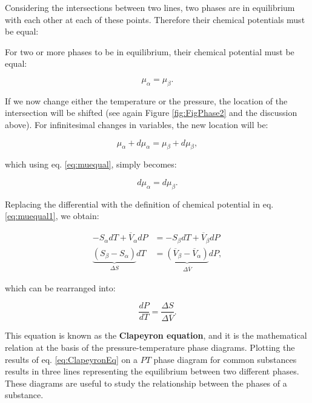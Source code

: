 \documentclass[
  9pt,
]{extbook}
\theoremstyle{definition}
\theoremstyle{definition}
\theoremstyle{definition}
\theoremstyle{definition}
\theoremstyle{remark}
\begin{document}
Considering the intersections between two lines, two phases are in equilibrium with each other at each of these points. Therefore their chemical potentials must be equal:

For two or more phases to be in equilibrium, their chemical potential must be equal:

\begin{equation}
\mu_{\alpha} = \mu_{\beta}.
\label{eq:muequal}
\end{equation}

If we now change either the temperature or the pressure, the location of the intersection will be shifted (see again Figure \ref{fig:FigPhase2} and the discussion above). For infinitesimal changes in variables, the new location will be:

\begin{equation}
\mu_{\alpha} + d\mu_{\alpha}= \mu_{\beta}+d\mu_{\beta},
\label{eq:muequalA}
\end{equation}

which using eq. \eqref{eq:muequal}, simply becomes:

\begin{equation}
d\mu_{\alpha}= d\mu_{\beta}.
\label{eq:muequalB}
\end{equation}

Replacing the differential with the definition of chemical potential in eq. \eqref{eq:muequal1}, we obtain:

\begin{equation}
\begin{aligned}
-S_{\alpha}dT+\overline{V}_{\alpha}dP &= -S_{\beta}dT+\overline{V}_{\beta}dP \\
\underbrace{\left(S_{\beta}-S_{\alpha}\right)}_{\Delta S} dT &= \underbrace{\left( \overline{V}_{\beta}-\overline{V}_{\alpha}\right)}_{\Delta \overline{V}}dP,
\end{aligned}
\label{eq:muequalC}
\end{equation}

which can be rearranged into:

\begin{equation}
\frac{dP}{dT}=\frac{\Delta S}{\Delta \overline{V}}.
\label{eq:ClapeyronEq}
\end{equation}

This equation is known as the \textbf{Clapeyron equation}, and it is the mathematical relation at the basis of the pressure-temperature phase diagrams. Plotting the results of eq. \eqref{eq:ClapeyronEq} on a \(PT\) phase diagram for common substances results in three lines representing the equilibrium between two different phases. These diagrams are useful to study the relationship between the phases of a substance.
\end{document}
